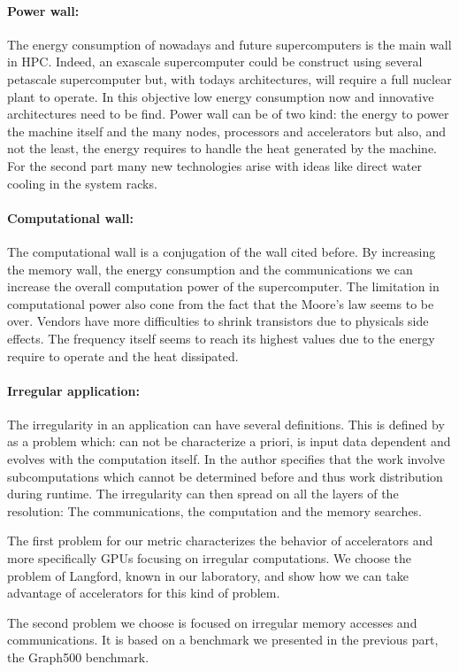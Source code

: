 \paragraph{Power wall: }
The energy consumption of nowadays and future supercomputers is the main wall in HPC. 
Indeed, an exascale supercomputer could be construct using several petascale supercomputer but, with todays architectures, will require a full nuclear plant to operate. 
In this objective low energy consumption now and innovative architectures need to be find. 
Power wall can be of two kind: the energy to power the machine itself and the many nodes, processors and accelerators but also, and not the least, the energy requires to handle the heat generated by the machine. 
For the second part many new technologies arise with ideas like direct water cooling in the system racks.

\paragraph{Computational wall: }
The computational wall is a conjugation of the wall cited before. 
By increasing the memory wall, the energy consumption and the communications we can increase the overall computation power of the supercomputer. 
The limitation in computational power also cone from the fact that the Moore's law seems to be over. 
Vendors have more difficulties to shrink transistors due to physicals side effects. 
The frequency itself seems to reach its highest values due to the energy require to operate and the heat dissipated. 

\paragraph{Irregular application: }
The irregularity in an application can have several definitions. 
This is defined by \cite{javairregular} as a problem which: can not be characterize a priori, is input data dependent and evolves with the computation itself. 
In \cite{suss2006implementing} the author specifies that the work involve subcomputations which cannot be determined before and thus work distribution during runtime.
The irregularity can then spread on all the layers of the resolution:
The communications, the computation and the memory searches. 

The first problem for our metric characterizes the behavior of accelerators and more specifically GPUs focusing on irregular computations. 
We choose the problem of Langford, known in our laboratory, and show how we can take advantage of accelerators for this kind of problem. 

The second problem we choose is focused on irregular memory accesses and communications. 
It is based on a benchmark we presented in the previous part, the Graph500 benchmark.